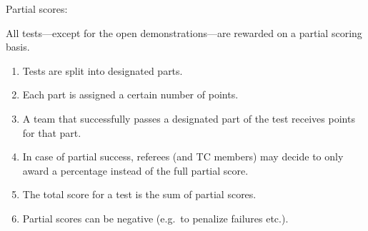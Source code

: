 \begin{enumerate}
	{\bf\item Partial scores:} All tests---except for the open demonstrations---are rewarded on a partial scoring basis. 
	\begin{enumerate}
		\item Tests are split into designated parts.
		\item Each part is assigned a certain number of points.
		\item A team that successfully passes a designated part of the test receives points for that part.
		\item In case of partial success, referees (and TC members) may decide to only award a percentage instead of the full partial score.  
		\item The total score for a test is the sum of partial scores.
		\item Partial scores can be negative (e.g.~to penalize failures etc.).
	\end{enumerate}
\end{enumerate}


